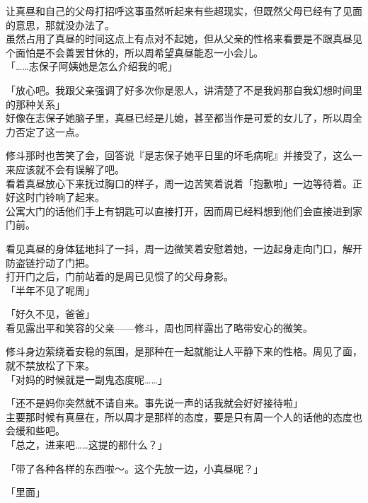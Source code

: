 让真昼和自己的父母打招呼这事虽然听起来有些超现实，但既然父母已经有了见面的意思，那就没办法了。\\

虽然占用了真昼的时间这点上有点对不起她，但从父亲的性格来看要是不跟真昼见个面怕是不会善罢甘休的，所以周希望真昼能忍一小会儿。\\

「……志保子阿姨她是怎么介绍我的呢」

「放心吧。我跟父亲强调了好多次你是恩人，讲清楚了不是我妈那自我幻想时间里的那种关系」\\

好像在志保子她脑子里，真昼已经是儿媳，甚至都当作是可爱的女儿了，所以周全力否定了这一点。

修斗那时也苦笑了会，回答说『是志保子她平日里的坏毛病呢』并接受了，这么一来应该就不会有误解了吧。\\

看着真昼放心下来抚过胸口的样子，周一边苦笑着说着「抱歉啦」一边等待着。正好这时门铃响了起来。\\

公寓大门的话他们手上有钥匙可以直接打开，因而周已经料想到他们会直接进到家门前。

看见真昼的身体猛地抖了一抖，周一边微笑着安慰着她，一边起身走向门口，解开防盗链拧动了门把。\\

打开门之后，门前站着的是周已见惯了的父母身影。\\

「半年不见了呢周」

「好久不见，爸爸」\\

看见露出平和笑容的父亲——修斗，周也同样露出了略带安心的微笑。

修斗身边萦绕着安稳的氛围，是那种在一起就能让人平静下来的性格。周见了面，就不禁放松了下来。\\

「对妈的时候就是一副鬼态度呢……」

「还不是妈你突然就不请自来。事先说一声的话我就会好好接待啦」\\

主要那时候有真昼在，所以周才是那样的态度，要是只有周一个人的话他的态度也会缓和些吧。\\

「总之，进来吧……这提的都什么？」

「带了各种各样的东西啦～。这个先放一边，小真昼呢？」

「里面」\\

